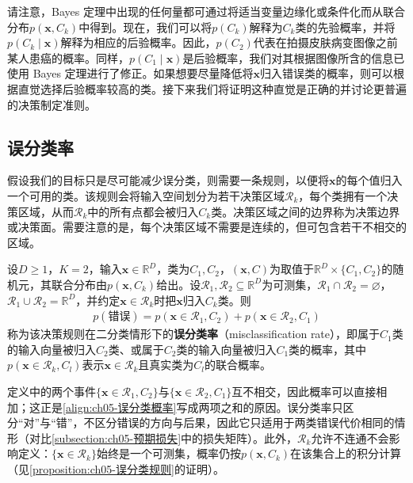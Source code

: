 \documentclass[../../main.tex]{subfiles}
\begin{document}
请注意，Bayes 定理中出现的任何量都可通过将适当变量边缘化或条件化而从联合分布$p(\boldsymbol{x},C_k)$中得到。现在，我们可以将$p(C_k)$解释为$C_k$类的先验概率，并将$p(C_k\mid\boldsymbol{x})$解释为相应的后验概率。因此，$p(C_2)$代表在拍摄皮肤病变图像之前某人患癌的概率。同样，$p(C_1\mid\boldsymbol{x})$是后验概率，我们对其根据图像所含的信息已使用 Bayes 定理进行了修正。如果想要尽量降低将$\boldsymbol{x}$归入错误类的概率，则可以根据直觉选择后验概率较高的类。接下来我们将证明这种直觉是正确的并讨论更普遍的决策制定准则。

\subsection{误分类率}\label{subsection:ch05-误分类率}

假设我们的目标只是尽可能减少误分类，则需要一条规则，以便将$\boldsymbol{x}$的每个值归入一个可用的类。该规则会将输入空间划分为若干决策区域$\mathcal{R}_k$，每个类拥有一个决策区域，从而$\mathcal{R}_k$中的所有点都会被归入$C_k$类。决策区域之间的边界称为决策边界或决策面。需要注意的是，每个决策区域不需要是连续的，但可包含若干不相交的区域。

\begin{definition}[误分类率]\label{definition:ch05-误分类率}
设$D\geqslant1$，$K=2$，输入$\boldsymbol{x}\in\mathbb{R}^{D}$，类为$C_1,C_2$，$(\boldsymbol{x},C)$为取值于$\mathbb{R}^{D}\times\{C_1,C_2\}$的随机元，其联合分布由$p(\boldsymbol{x},C_k)$给出。设$\mathcal{R}_1,\mathcal{R}_2\subseteq\mathbb{R}^{D}$为可测集，$\mathcal{R}_1\cap\mathcal{R}_2=\varnothing$，$\mathcal{R}_1\cup\mathcal{R}_2=\mathbb{R}^{D}$，并约定$\boldsymbol{x}\in\mathcal{R}_k$时把$\boldsymbol{x}$归入$C_k$类。则
\begin{align}
  p(\text{错误})=p(\boldsymbol{x}\in\mathcal{R}_1,C_2)+p(\boldsymbol{x}\in\mathcal{R}_2,C_1)
  \label{align:ch05-误分类概率}
\end{align}
称为该决策规则在二分类情形下的\textbf{误分类率}（misclassification rate），即属于$C_1$类的输入向量被归入$C_2$类、或属于$C_2$类的输入向量被归入$C_1$类的概率，其中$p(\boldsymbol{x}\in\mathcal{R}_k,C_l)$表示$\boldsymbol{x}\in\mathcal{R}_k$且真实类为$C_l$的联合概率。
\end{definition}

\begin{remark}
定义中的两个事件$\{\boldsymbol{x}\in\mathcal{R}_1,C_2\}$与$\{\boldsymbol{x}\in\mathcal{R}_2,C_1\}$互不相交，因此概率可以直接相加；这正是\eqref{align:ch05-误分类概率}写成两项之和的原因。误分类率只区分“对”与“错”，不区分错误的方向与后果，因此它只适用于两类错误代价相同的情形（对比\cref{subsection:ch05-预期损失}中的损失矩阵）。此外，$\mathcal{R}_k$允许不连通不会影响定义：$\{\boldsymbol{x}\in\mathcal{R}_k\}$始终是一个可测集，概率仍按$p(\boldsymbol{x},C_k)$在该集合上的积分计算（见\cref{proposition:ch05-误分类规则}的证明）。
\end{remark}
\end{document}
